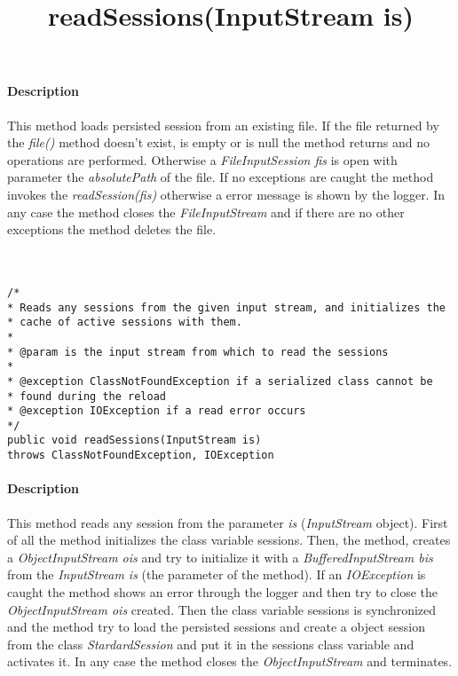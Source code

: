 \paragraph{Description} This method loads persisted session from an existing file. If the file returned by the \textit{file()} method doesn't exist, is empty or is null the method returns and no operations are performed. Otherwise a \textit{FileInputSession fis} is open with parameter the \textit{absolutePath} of the file. If no exceptions are caught the method invokes the \textit{readSession(fis)} otherwise a error message is shown by the logger. In any case the method closes the \textit{FileInputStream} and if there are no other exceptions the method deletes the file.\\\\\\


\title{{\large \textbf{readSessions(InputStream is)}}}
\lstset{firstnumber=509}
\begin{lstlisting}
/*
* Reads any sessions from the given input stream, and initializes the
* cache of active sessions with them.
*
* @param is the input stream from which to read the sessions
*
* @exception ClassNotFoundException if a serialized class cannot be
* found during the reload
* @exception IOException if a read error occurs
*/
public void readSessions(InputStream is)
throws ClassNotFoundException, IOException
\end{lstlisting}

\paragraph{Description} This method reads any session from the parameter \textit{is} (\textit{InputStream} object). First of all the method initializes the class variable sessions. Then, the method, creates a \textit{ObjectInputStream ois} and try to initialize it with a \textit{BufferedInputStream bis} from the \textit{InputStream is} (the parameter of the method). If an \textit{IOException} is caught the method shows an error through the logger and then try to close the \textit{ObjectInputStream ois} created. Then the class variable sessions is synchronized and the method try to load the persisted sessions and create a object session from the class \textit{StardardSession} and put it in the sessions class variable and activates it. In any case the method closes the \textit{ObjectInputStream} and terminates.\\\\\\


